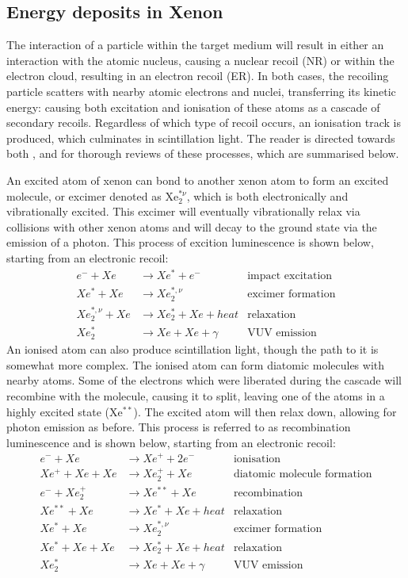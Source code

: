 \subsection{Energy deposits in Xenon}
\par
The interaction of a particle within the target medium will result in either an interaction with the atomic nucleus, causing a nuclear recoil (NR) or within the electron cloud, resulting in an electron recoil (ER).
In both cases, the recoiling particle scatters with nearby atomic electrons and nuclei, transferring its kinetic energy: causing both excitation and ionisation of these atoms as a cascade of secondary recoils.
Regardless of which type of recoil occurs, an ionisation track is produced, which culminates in scintillation light.
The reader is directed towards both \cite{xenon_physics_ref}, and \cite{carldahl_thesis_ref} for thorough reviews of these processes, which are summarised below.
\par
An excited atom of xenon can bond to another xenon atom to form an excited molecule, or excimer denoted as Xe$_2^{*\nu}$, which is both electronically and vibrationally excited.
This excimer will eventually vibrationally relax via collisions with other xenon atoms and will decay to the ground state via the emission of a photon.
This process of excition luminescence is shown below, starting from an electronic recoil:
\begin{align*}
    e^- + Xe &\rightarrow Xe^* + e^-  &\text{impact excitation} \\ 
    Xe^* + Xe &\rightarrow Xe_2^{*,\nu} &\text{excimer formation} \\
    Xe_2^{*,\nu} + Xe &\rightarrow Xe_2^* + Xe + heat &\text{relaxation} \\
    Xe_2^* &\rightarrow Xe + Xe + \gamma &\text{VUV emission} 
\end{align*}
An ionised atom can also produce scintillation light, though the path to it is somewhat more complex.
The ionised atom can form diatomic molecules with nearby atoms.
Some of the electrons which were liberated during the cascade will recombine with the molecule, causing it to split, leaving one of the atoms in a highly excited state (Xe$^{**}$).
The excited atom will then relax down, allowing for photon emission as before.
This process is referred to as recombination luminescence and is shown below, starting from an electronic recoil:
\begin{align*}
    e^- + Xe &\rightarrow Xe^+ + 2e^- &\text{ionisation} \\ 
    Xe^+ + Xe + Xe &\rightarrow Xe_2^{+} + Xe &\text{diatomic molecule formation} \\
    e^- + Xe_2^+ &\rightarrow Xe^{**} + Xe &\text{recombination} \\
    Xe^{**} + Xe &\rightarrow Xe^{*} + Xe + heat &\text{relaxation} \\
    Xe^{*} + Xe  &\rightarrow Xe_2^{*,\nu} &\text{excimer formation} \\
    Xe^{*} + Xe + Xe &\rightarrow Xe_2^{*} + Xe + heat &\text{relaxation} \\
    Xe_2^* &\rightarrow Xe + Xe + \gamma &\text{VUV emission} 
\end{align*}
